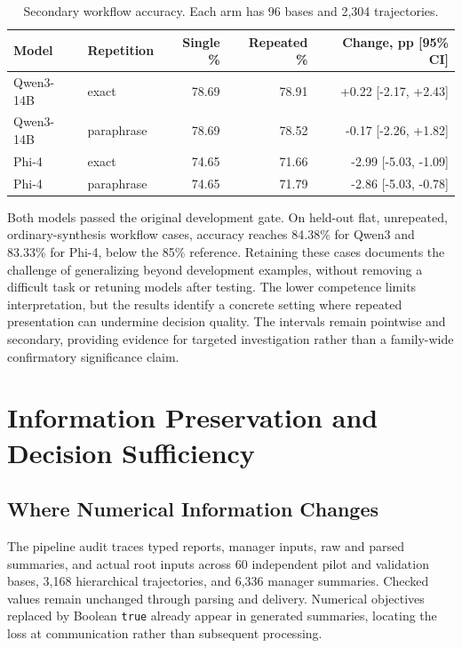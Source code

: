\documentclass{svproc}
\begin{document}
\begin{table}[htbp]
\centering\small
\setlength{\tabcolsep}{4pt}
\caption{Secondary workflow accuracy. Each arm has 96 bases and 2,304 trajectories.}\label{tab:workflow}
\begin{tabular}{llrrr}\toprule
Model & Repetition & Single \% & Repeated \% & Change, pp [95\% CI]\\\midrule
Qwen3-14B & exact & 78.69 & 78.91 & +0.22 [-2.17, +2.43]\\
Qwen3-14B & paraphrase & 78.69 & 78.52 & -0.17 [-2.26, +1.82]\\
Phi-4 & exact & 74.65 & 71.66 & -2.99 [-5.03, -1.09]\\
Phi-4 & paraphrase & 74.65 & 71.79 & -2.86 [-5.03, -0.78]\\
\bottomrule\end{tabular}
\end{table}

Both models passed the original development gate. On held-out flat, unrepeated,
ordinary-synthesis workflow cases, accuracy reaches 84.38\% for Qwen3 and
83.33\% for Phi-4, below the 85\% reference. Retaining these cases documents
the challenge of generalizing beyond development examples, without removing
a difficult task or retuning models after testing. The lower competence limits
interpretation, but the results identify a concrete setting where repeated
presentation can undermine decision quality. The intervals remain pointwise
and secondary, providing evidence for targeted investigation rather than a
family-wide confirmatory significance claim.





\section{Information Preservation and Decision Sufficiency}
\label{sec:preservation}

\subsection{Where Numerical Information Changes}
The pipeline audit traces typed reports, manager inputs, raw and parsed summaries, and actual root inputs across 60 independent pilot and validation bases, 3,168 hierarchical trajectories, and 6,336 manager summaries. Checked values remain unchanged through parsing and delivery. Numerical objectives replaced by Boolean \texttt{true} already appear in generated summaries, locating the loss at communication rather than subsequent processing.
\end{document}
